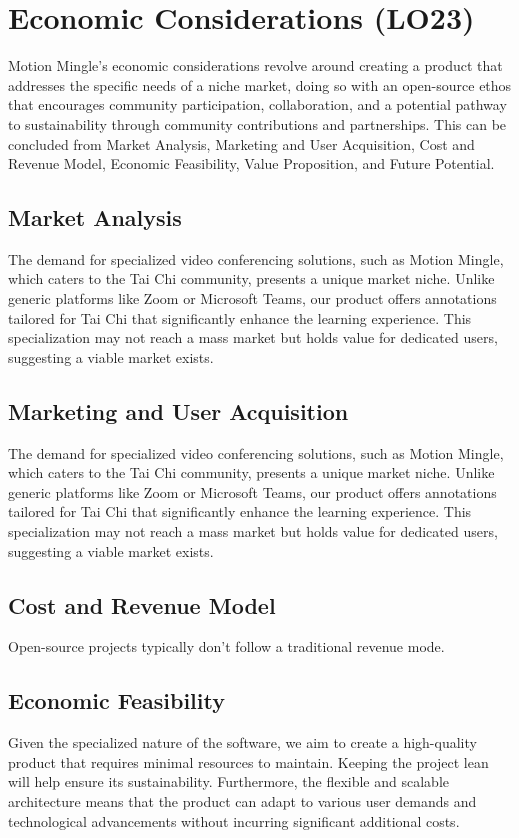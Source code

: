 \documentclass{article}
\begin{document}
\section{Economic Considerations (LO23)}
Motion Mingle's economic considerations revolve around creating a product that addresses the specific needs of a niche market, doing so with an open-source ethos that encourages community participation, collaboration, and a potential pathway to sustainability through community contributions and partnerships.
This can be concluded from Market Analysis, Marketing and User Acquisition, Cost and Revenue Model, Economic Feasibility, Value Proposition, and Future Potential. 
\subsection{Market Analysis}
The demand for specialized video conferencing solutions, such as Motion Mingle, which caters to the Tai Chi community, presents a unique market niche. 
Unlike generic platforms like Zoom or Microsoft Teams, our product offers annotations tailored for Tai Chi that significantly enhance the learning experience. 
This specialization may not reach a mass market but holds value for dedicated users, suggesting a viable market exists.
\subsection{Marketing and User Acquisition}
The demand for specialized video conferencing solutions, such as Motion Mingle, which caters to the Tai Chi community, presents a unique market niche.
Unlike generic platforms like Zoom or Microsoft Teams, our product offers annotations tailored for Tai Chi that significantly enhance the learning experience. 
This specialization may not reach a mass market but holds value for dedicated users, suggesting a viable market exists.
\subsection{Cost and Revenue Model}
Open-source projects typically don't follow a traditional revenue mode.
\subsection{Economic Feasibility}
Given the specialized nature of the software, we aim to create a high-quality product that requires minimal resources to maintain. 
Keeping the project lean will help ensure its sustainability. Furthermore, the flexible and scalable architecture means that the product can adapt to various user demands and technological advancements without incurring significant additional costs.
\end{document}
